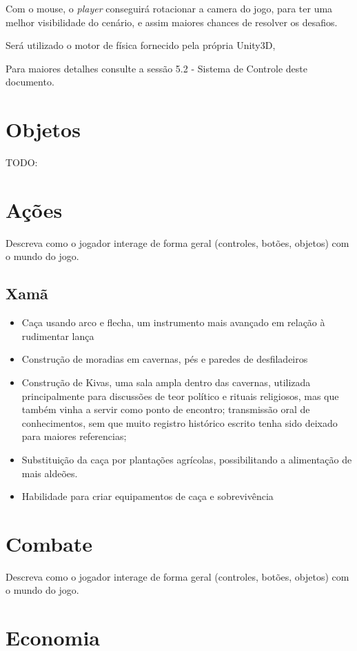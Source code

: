 Com o mouse, o \textit{player} conseguirá rotacionar a camera do jogo, para ter uma melhor visibilidade do cenário, e assim maiores chances de resolver os desafios.

Será utilizado o motor de física fornecido pela própria Unity3D,

Para maiores detalhes consulte a sessão 5.2 - Sistema de Controle deste documento.

\section{Objetos}

TODO:

\section{Ações}

Descreva como o jogador interage de forma geral (controles, botões, objetos) com o mundo do jogo.

\subsection{Xamã}
\begin{itemize}
\item Caça usando arco e flecha, um instrumento mais avançado em relação à rudimentar lança
\item Construção de moradias em cavernas, pés e paredes de desfiladeiros
\item Construção de Kivas, uma sala ampla dentro das cavernas, utilizada principalmente para discussões de teor político e rituais religiosos, mas que também vinha a servir como ponto de encontro; transmissão oral de conhecimentos, sem que muito registro histórico escrito tenha sido deixado para maiores referencias;
\item Substituição da caça por plantações agrícolas, possibilitando a alimentação de mais aldeões.
\item Habilidade para criar equipamentos de caça e sobrevivência
\end{itemize}

\section{Combate}

Descreva como o jogador interage de forma geral (controles, botões, objetos) com o mundo do jogo.

\section{Economia}

